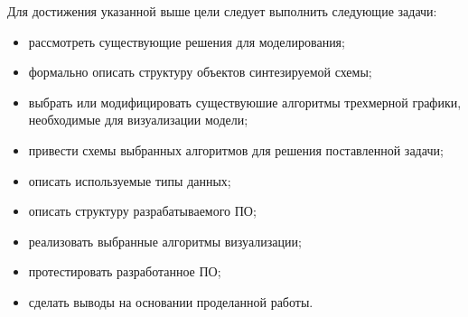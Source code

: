 Для достижения указанной выше цели следует выполнить следующие задачи:
\begin{itemize}
	\item рассмотреть существующие решения для моделирования;
	\item формально описать структуру объектов синтезируемой схемы;
	\item выбрать или модифицировать существуюшие алгоритмы трехмерной графики, необходимые для визуализации модели;
	\item привести схемы выбранных алгоритмов для решения поставленной задачи;
	\item описать используемые типы данных;
	\item описать структуру разрабатываемого ПО;
	\item реализовать выбранные алгоритмы визуализации;
	\item протестировать разработанное ПО;
	\item сделать выводы на основании проделанной работы.
\end{itemize}

